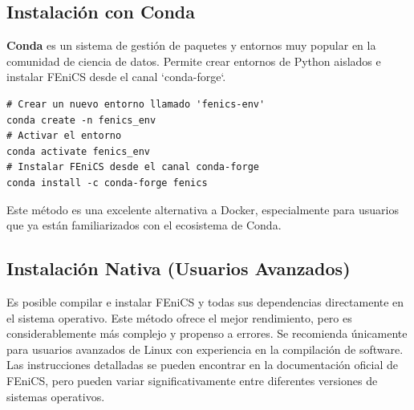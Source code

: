 \subsection{Instalación con Conda}
\textbf{Conda} es un sistema de gestión de paquetes y entornos muy popular en la comunidad de ciencia de datos. Permite crear entornos de Python aislados e instalar FEniCS desde el canal `conda-forge`.
\begin{verbatim}
# Crear un nuevo entorno llamado 'fenics-env'
conda create -n fenics_env
# Activar el entorno
conda activate fenics_env
# Instalar FEniCS desde el canal conda-forge
conda install -c conda-forge fenics
\end{verbatim}
Este método es una excelente alternativa a Docker, especialmente para usuarios que ya están familiarizados con el ecosistema de Conda.

\subsection{Instalación Nativa (Usuarios Avanzados)}
Es posible compilar e instalar FEniCS y todas sus dependencias directamente en el sistema operativo. Este método ofrece el mejor rendimiento, pero es considerablemente más complejo y propenso a errores. Se recomienda únicamente para usuarios avanzados de Linux con experiencia en la compilación de software. Las instrucciones detalladas se pueden encontrar en la documentación oficial de FEniCS, pero pueden variar significativamente entre diferentes versiones de sistemas operativos.